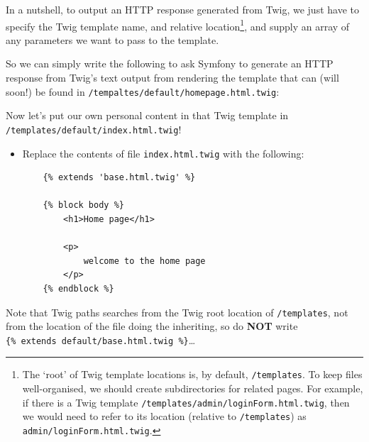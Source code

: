 \documentclass[a4paperpaper,openright]{book}
\newenvironment{Shaded}{}{}
\newcommand{\AnnotationTok}[1]{\textcolor[rgb]{0.38,0.63,0.69}{\textbf{\textit{#1}}}}
\newcommand{\CommentTok}[1]{\textcolor[rgb]{0.38,0.63,0.69}{\textit{#1}}}
\newcommand{\KeywordTok}[1]{\textcolor[rgb]{0.00,0.44,0.13}{\textbf{#1}}}
\newcommand{\NormalTok}[1]{#1}
\newcommand{\OtherTok}[1]{\textcolor[rgb]{0.00,0.44,0.13}{#1}}
\newcommand{\StringTok}[1]{\textcolor[rgb]{0.25,0.44,0.63}{#1}}
\begin{document}
In a nutshell, to output an HTTP response generated from Twig, we just
have to specify the Twig template name, and relative location\footnote{The
  `root' of Twig template locations is, by default, \texttt{/templates}.
  To keep files well-organised, we should create subdirectories for
  related pages. For example, if there is a Twig template
  \texttt{/templates/admin/loginForm.html.twig}, then we would need to
  refer to its location (relative to \texttt{/templates}) as
  \texttt{admin/loginForm.html.twig}. }, and supply an array of any
parameters we want to pass to the template.

So we can simply write the following to ask Symfony to generate an HTTP
response from Twig's text output from rendering the template that can
(will soon!) be found in \texttt{/tempaltes/default/homepage.html.twig}:

\begin{Shaded}
\end{Shaded}

Now let's put our own personal content in that Twig template in
\texttt{/templates/default/index.html.twig}!

\begin{itemize}
\item
  Replace the contents of file \texttt{index.html.twig} with the
  following:

\begin{verbatim}
    {% extends 'base.html.twig' %}

    {% block body %}
        <h1>Home page</h1>

        <p>
            welcome to the home page
        </p>
    {% endblock %}
\end{verbatim}
\end{itemize}

Note that Twig paths searches from the Twig root location of
\texttt{/templates}, not from the location of the file doing the
inheriting, so do \textbf{NOT} write
\texttt{\{\%\ extends\ \textquotesingle{}default/base.html.twig\textquotesingle{}\ \%\}}\ldots{}
\end{document}
